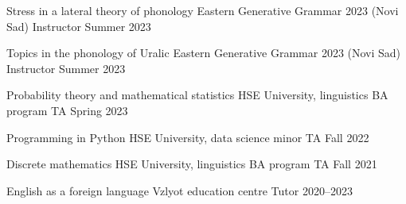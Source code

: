 

\begin{cvhonors}

  \cvhonor
    {Stress in a lateral theory of phonology} %
    {Eastern Generative Grammar 2023 (Novi Sad)} %
    {Instructor} %
    {Summer 2023} %

  \cvhonor
    {Topics in the phonology of Uralic} %
    {Eastern Generative Grammar 2023 (Novi Sad)} %
    {Instructor} %
    {Summer 2023} %

  \cvhonor
    {Probability theory and mathematical statistics} %
    {HSE University, linguistics BA program} %
    {TA} %
    {Spring 2023} %

  \cvhonor
    {Programming in Python} %
    {HSE University, data science minor} %
    {TA} %
    {Fall 2022} %

  \cvhonor
    {Discrete mathematics} %
    {HSE University, linguistics BA program} %
    {TA} %
    {Fall 2021} %

  \cvhonor
    {English as a foreign language} %
    {Vzlyot education centre} %
    {Tutor} %
    {2020--2023} %

\end{cvhonors}
